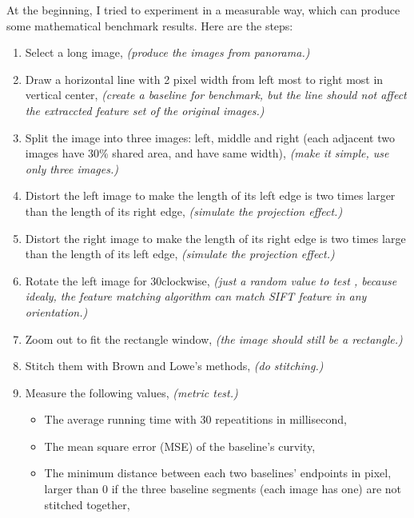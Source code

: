 \documentclass[10pt,twocolumn,letterpaper]{article}
\begin{document}
At the beginning, I tried to experiment in a measurable way, which can produce some mathematical benchmark results. Here are the steps:
\begin{enumerate}
    \item Select a long image, \textit{(produce the images from panorama.)}
    \item Draw a horizontal line with 2 pixel width from left most to right most in vertical center, \textit{(create a baseline for benchmark, but the line should not affect the extraccted feature set of the original images.)}
    \item Split the image into three images: left, middle and right (each adjacent two images have 30\% shared area, and have same width), \textit{(make it simple, use only three images.)}
    \item Distort the left image to make the length of its left edge is two times larger than the length of its right edge, \textit{(simulate the projection effect.)}
    \item Distort the right image to make the length of its right edge is two times large than the length of its left edge, \textit{(simulate the projection effect.)}
    \item Rotate the left image for 30\degree clockwise, \textit{(just a random value to test , because idealy, the feature matching algorithm can match SIFT feature in any orientation.)}
    \item Zoom out to fit the rectangle window, \textit{(the image should still be a rectangle.)}
    \item Stitch them with Brown and Lowe's methods, \textit{(do stitching.)}
    \item Measure the following values, \textit{(metric test.)} 
    \begin{itemize}
        \item The average running time with 30 repeatitions in millisecond,
        \item The mean square error (MSE) of the baseline's curvity,
        \item The minimum distance between each two baselines' endpoints in pixel, larger than 0 if the three baseline segments (each image has one) are not stitched together,
    \end{itemize}
\end{enumerate}

\end{document}
